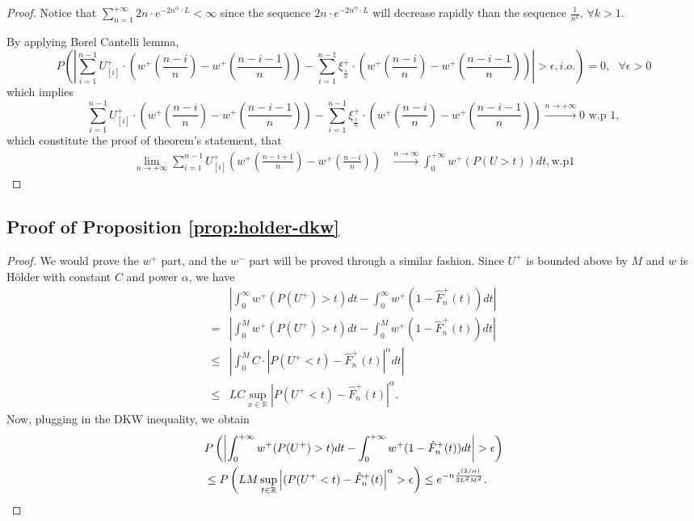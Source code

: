 \begin{proof}
Notice that $\sum_{n=1}^{+\infty}  2n \cdot e^{-2n^{\alpha}\cdot L}< \infty$ since the sequence 
$2n \cdot e^{-2n^{\alpha}\cdot L}$ will decrease rapidly than the sequence
$\frac{1}{n^k}$, $\forall k>1$.

By applying Borel Cantelli lemma,
$$
P ( \left| \sum_{i=1}^{n-1} U^+_{[i]} \cdot (w^+(\frac{n-i}{n} )  - w^+(\frac{n-i-1}{n} ) ) -
\sum_{i=1}^{n-1} \xi^+_{\frac{i}{n}} \cdot (w^+(\frac{n-i}{n} )  - w^+(\frac{n-i-1}{n} ) ) \right| >
\epsilon , i.o.) =0 , \text{   } \forall \epsilon >0 $$
which implies 
$$
\sum_{i=1}^{n-1} U^+_{[i]} \cdot (w^+(\frac{n-i}{n} )  - w^+(\frac{n-i-1}{n} ) ) - \sum_{i=1}^{n-1}
\xi^+_{\frac{i}{n}} \cdot (w^+(\frac{n-i}{n} )  - w^+(\frac{n-i-1}{n} ) ) \xrightarrow{n \rightarrow
+\infty} 0 \text{   w.p } 1 ,
$$
which constitute the proof of theorem's statement, that 
\begin{align}
\lim_{n\rightarrow +\infty} \sum_{i=1}^{n-1} U^+_{ [i ] } (w^+(\frac{n-i+1}{n})- w^+(\frac{n-i}{n}))
&\xrightarrow{n \rightarrow\infty} \int_0^{+\infty} w^+(P(U>t)) dt, \text{w.p} 1
\end{align}
\end{proof}

\subsection*{Proof of Proposition \ref{prop:holder-dkw}}
\begin{proof}
We would prove the $w^+$ part, and the $w^-$ part will be proved through a similar fashion.
Since $U^+$ is bounded above by $M$ and $w$ is H\"{o}lder with constant $C$ and power $\alpha$, we have
\begin{align*}
&\left|\int_0^{\infty} w^+(P(U^+)>t) dt- \int_0^{\infty} w^+(1- {\hat F^+_n}(t)) dt\right| \\ = &
    \left|\int_0^M w^+(P(U^+)>t) dt- \int_0^M w^+(1- {\hat F^+_n}(t)) dt\right| \\
\leq& \left|\int_0^M C\cdot |P(U^+<t)-{\hat F^+_n}(t)|^\alpha dt\right|\\ \leq& LC\sup_{x\in
\mathbb{R}}\left|P(U^+<t)-{\hat F^+_n}(t)\right|^\alpha.
\end{align*}
Now, plugging in the DKW inequality, we obtain
\begin{align}
&
P\left(\left|\intinfinity w^+(P(U^+)>t) dt- \intinfinity w^+(1- {\hat F^+_n}(t)) dt\right|>\epsilon\right)
\nonumber\\
& \leq P\left(LM\sup_{t\in \mathbb{R}} \left|(P(U^+<t)-{\hat F^+_n}(t)\right|^\alpha>\epsilon\right)
\leq  e^{-n \frac{\epsilon ^{(2/\alpha)}} {2 L^2 M^2}}.\label{eq:dkw3}
\end{align}
\end{proof}


